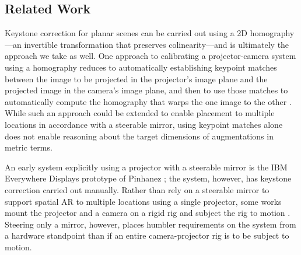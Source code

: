 \documentclass[review]{elsarticle}
\begin{document}
\subsection{Related Work}

Keystone correction for planar scenes can be carried out using a 2D homography \cite{Hartley2004}---an invertible transformation that preserves colinearity---and is ultimately the approach we take as well. One approach to calibrating a projector-camera system using a homography reduces to automatically establishing keypoint matches between the image to be projected in the projector's image plane and the projected image in the camera's image plane, and then to use those matches to automatically compute the homography that warps the one image to the other \cite{sukthankar2001smarter}. While such an approach could be extended to enable placement to multiple locations in accordance with a steerable mirror, using keypoint matches alone does not enable reasoning about the target dimensions of augmentations in metric terms.

An early system explicitly using a projector with a steerable mirror is the IBM Everywhere Displays prototype of Pinhanez \cite{pinhanez2001everywhere}; the system, however, has keystone correction carried out manually. Rather than rely on a steerable mirror to support spatial AR to multiple locations using a single projector, some works mount the projector and a camera on a rigid rig and subject the rig to motion \cite{ehnes2004projected,borkowski2004spatial,butz2006applying}. Steering only a mirror, however, places humbler requirements on the system from a hardware standpoint than if an entire camera-projector rig is to be subject to motion. 

\end{document}

